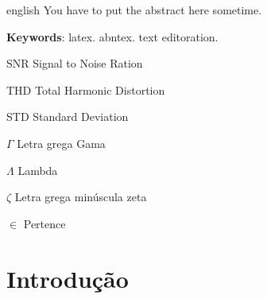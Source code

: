 \documentclass[
	12pt,				%
	openright,			%
	twoside,			%
	a4paper,			%
	english,			%
	french,				%
	spanish,			%
	brazil				%
	]{abntex2}
\begin{document}
\begin{resumo}[Abstract]
 \begin{otherlanguage*}{english}
   You have to put the abstract here sometime.

   \vspace{\onelineskip}
 
   \noindent 
   \textbf{Keywords}: latex. abntex. text editoration.
 \end{otherlanguage*}
\end{resumo}




\listoffigures*
\cleardoublepage

\listoftables*
\cleardoublepage

\begin{siglas}
  \item[SNR] Signal to Noise Ration
  \item[THD] Total Harmonic Distortion
  \item[STD] Standard Deviation
\end{siglas}

\begin{simbolos}
  \item[$ \Gamma $] Letra grega Gama
  \item[$ \Lambda $] Lambda
  \item[$ \zeta $] Letra grega minúscula zeta
  \item[$ \in $] Pertence
\end{simbolos}

\tableofcontents*
\cleardoublepage



\textual

\chapter*[Introdução]{Introdução}
\end{document}
